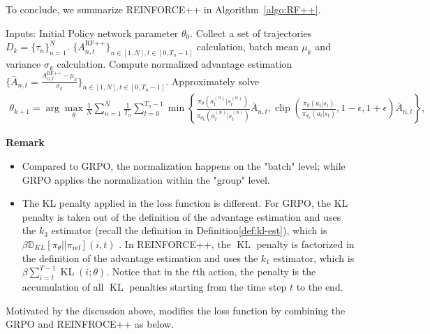 To conclude, we summarize REINFORCE++ in Algorithm~\ref{algo:RF++}.
\begin{algorithm}[H]
\caption{REINFORCE++}
\begin{algorithmic}[1]
    \State Inputs: Initial Policy network parameter $\theta_0$.
        \State Collect a set of trajectories $D_k=\{\tau_n\}_{n=1}^{N}$.
        \State $\{A_{n,t}^{\text{RF++}}\}_{n\in[1,N], t\in[0,T_n-1]}$ calculation, batch mean $\mu_k$ and variance $\sigma_k$  calculation.
        \State Compute normalized advantage estimation $\{\bar A_{n,t} = \frac{A^{\operatorname{RF++}}_{n,t}-\mu_k}{\sigma_k}\}_{n\in[1,N], t\in[0,T_n-1]}$.
        \State Approximately solve 
            \begin{align*}
                 \theta_{k+1}=\arg\max_{\theta} \frac{1}{N}\sum_{n=1}^{N}\frac{1}{T_n}
                  \sum_{t=0}^{T_n-1}  
                 \min\left\{\frac{\pi_{\theta}(a_t^{(n)}|s_t^{(n)})}{\pi_{\theta_{k}}(a_t^{(n)}|s_t^{(n)})}\bar A_{n,t}, \operatorname{clip}\left(\frac{\pi_{\theta}(a_t|s_t)}{\pi_{\theta_{k}}(a_t|s_t)}, 1-\epsilon, 1+\epsilon\right)
                 \bar A_{n,t}\right\},                 
            \end{align*}
    \EndFor
\end{algorithmic}
\label{algo:RF++}
\end{algorithm}


\textbf{Remark}
\begin{itemize}
    \item Compared to GRPO, the normalization happens on the "batch" level; while GRPO applies the normalization within the "group" level.
    \item The KL penalty applied in the loss function is different. For GRPO, the KL penalty is taken out of the definition of the advantage estimation and uses the $k_3$ estimator (recall the definition in Definition\ref{def:kl-est}), which is 
    $\beta\mathbb{D}_{K L}\left[\pi_\theta| | \pi_{\text{ref}}\right](i,t)$
   . In REINFORCE++, the $\operatorname{KL}$ penalty is factorized in the definition of the advantage estimation and uses the $k_1$ estimator, which is  $\beta\sum_{i=t}^{T-1}\operatorname{KL}(i;\theta)$. Notice that in the $t$th action, the penalty is the accumulation of all $\operatorname{KL}$ penalties starting from the time step $t$ to the end.
\end{itemize}

Motivated by the discussion above, \citet{xie2025logic} modifies the loss function by combining the GRPO and REINFROCE++ as below.

